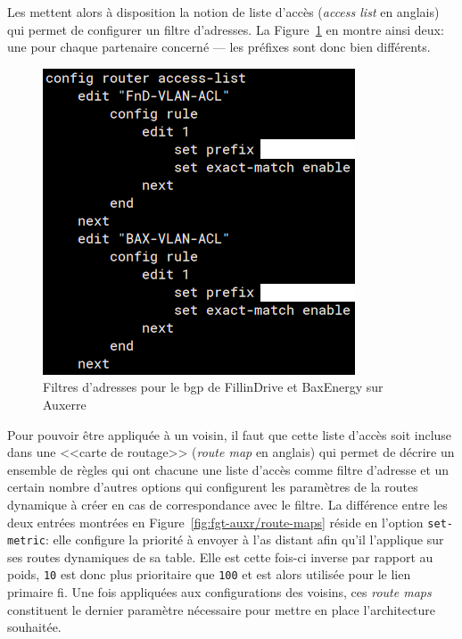 \documentclass[12pt, oneside, a4paper, titlepage]{report}
\begin{document}
Les  mettent alors à disposition la notion de liste d'accès
(\textit{access list} en anglais) qui permet de configurer un filtre d'adresses.
La Figure~\ref{fig:fgt-auxr/acl} en montre ainsi deux: une pour chaque
partenaire concerné --- les préfixes sont donc bien différents.

\begin{figure}[h!]
    \centering
    \includegraphics[width = 0.6\linewidth]{img/fgt-auxr/acl.png}
    \caption{%
        Filtres d'adresses pour le \gls{bgp} de FillinDrive et BaxEnergy sur
        Auxerre%
    }%
    \label{fig:fgt-auxr/acl}
\end{figure}

Pour pouvoir être appliquée à un voisin, il faut que cette liste d'accès soit
incluse dans une <<carte de routage>> (\textit{route map} en anglais) qui permet
de décrire un ensemble de règles qui ont chacune une liste d'accès comme filtre
d'adresse et un certain nombre d'autres options qui configurent les paramètres
de la routes dynamique à créer en cas de correspondance avec le filtre. La
différence entre les deux entrées montrées en
Figure~\ref{fig:fgt-auxr/route-maps} réside en l'option \texttt{set-metric}:
elle configure la priorité à envoyer à l'\gls{as} distant afin qu'il l'applique
sur ses routes dynamiques de sa table. Elle est cette fois-ci inverse par
rapport au poids, \texttt{10} est donc plus prioritaire que \texttt{100} et est
alors utilisée pour le lien primaire \gls{fi}. Une fois appliquées aux
configurations des voisins, ces \textit{route maps} constituent le dernier
paramètre nécessaire pour mettre en place l'architecture souhaitée.
\end{document}
